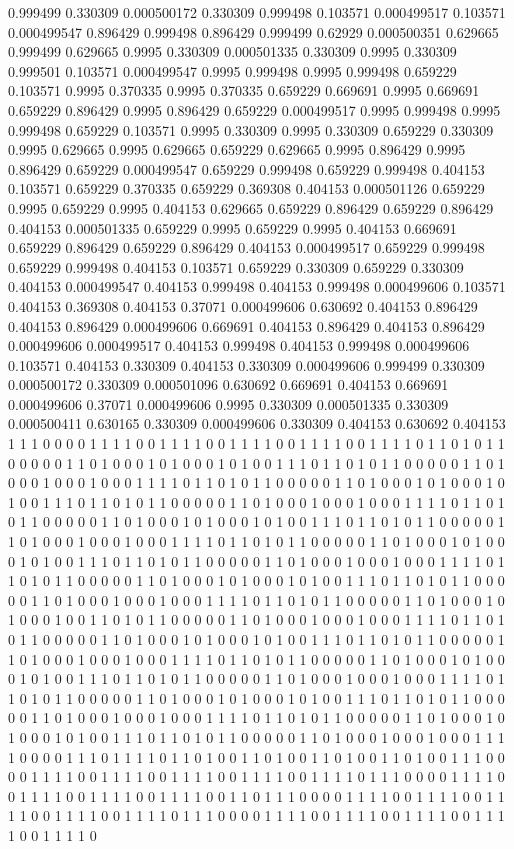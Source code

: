 0.999499 0.330309
0.000500172 0.330309
0.999498 0.103571
0.000499517 0.103571
0.000499547 0.896429
0.999498 0.896429
0.999499 0.62929
0.000500351 0.629665
0.999499 0.629665
0.9995 0.330309
0.000501335 0.330309
0.9995 0.330309
0.999501 0.103571
0.000499547 0.9995
0.999498 0.9995
0.999498 0.659229
0.103571 0.9995
0.370335 0.9995
0.370335 0.659229
0.669691 0.9995
0.669691 0.659229
0.896429 0.9995
0.896429 0.659229
0.000499517 0.9995
0.999498 0.9995
0.999498 0.659229
0.103571 0.9995
0.330309 0.9995
0.330309 0.659229
0.330309 0.9995
0.629665 0.9995
0.629665 0.659229
0.629665 0.9995
0.896429 0.9995
0.896429 0.659229
0.000499547 0.659229
0.999498 0.659229
0.999498 0.404153
0.103571 0.659229
0.370335 0.659229
0.369308 0.404153
0.000501126 0.659229
0.9995 0.659229
0.9995 0.404153
0.629665 0.659229
0.896429 0.659229
0.896429 0.404153
0.000501335 0.659229
0.9995 0.659229
0.9995 0.404153
0.669691 0.659229
0.896429 0.659229
0.896429 0.404153
0.000499517 0.659229
0.999498 0.659229
0.999498 0.404153
0.103571 0.659229
0.330309 0.659229
0.330309 0.404153
0.000499547 0.404153
0.999498 0.404153
0.999498 0.000499606
0.103571 0.404153
0.369308 0.404153
0.37071 0.000499606
0.630692 0.404153
0.896429 0.404153
0.896429 0.000499606
0.669691 0.404153
0.896429 0.404153
0.896429 0.000499606
0.000499517 0.404153
0.999498 0.404153
0.999498 0.000499606
0.103571 0.404153
0.330309 0.404153
0.330309 0.000499606
0.999499 0.330309
0.000500172 0.330309
0.000501096 0.630692
0.669691 0.404153
0.669691 0.000499606
0.37071 0.000499606
0.9995 0.330309
0.000501335 0.330309
0.000500411 0.630165
0.330309 0.000499606
0.330309 0.404153
0.630692 0.404153
1 1
1 0
0 0
0 1
1 1
1 0
0 1
1 1
1 0
0 1
1 1
1 0
0 1
1 1
1 0
0 1
1 1
1 0
1 1
0 1
0 1
1 0
0 0
0 0
1 1
0 1
0 0
0 1
0 1
0 0
0 1
0 1
0 0
1 1
1 0
1 1
0 1
0 1
1 0
0 0
0 0
1 1
0 1
0 0
0 1
0 0
0 1
0 0
0 1
1 1
1 0
1 1
0 1
0 1
1 0
0 0
0 0
1 1
0 1
0 0
0 1
0 1
0 0
0 1
0 1
0 0
1 1
1 0
1 1
0 1
0 1
1 0
0 0
0 0
1 1
0 1
0 0
0 1
0 0
0 1
0 0
0 1
1 1
1 0
1 1
0 1
0 1
1 0
0 0
0 0
1 1
0 1
0 0
0 1
0 1
0 0
0 1
0 1
0 0
1 1
1 0
1 1
0 1
0 1
1 0
0 0
0 0
1 1
0 1
0 0
0 1
0 0
0 1
0 0
0 1
1 1
1 0
1 1
0 1
0 1
1 0
0 0
0 0
1 1
0 1
0 0
0 1
0 1
0 0
0 1
0 1
0 0
1 1
1 0
1 1
0 1
0 1
1 0
0 0
0 0
1 1
0 1
0 0
0 1
0 0
0 1
0 0
0 1
1 1
1 0
1 1
0 1
0 1
1 0
0 0
0 0
1 1
0 1
0 0
0 1
0 1
0 0
0 1
0 1
0 0
1 1
1 0
1 1
0 1
0 1
1 0
0 0
0 0
1 1
0 1
0 0
0 1
0 0
0 1
0 0
0 1
1 1
1 0
1 1
0 1
0 1
1 0
0 0
0 0
1 1
0 1
0 0
0 1
0 1
0 0
0 1
0 0
1 1
0 1
0 1
1 0
0 0
0 0
1 1
0 1
0 0
0 1
0 0
0 1
0 0
0 1
1 1
1 0
1 1
0 1
0 1
1 0
0 0
0 0
1 1
0 1
0 0
0 1
0 1
0 0
0 1
0 1
0 0
1 1
1 0
1 1
0 1
0 1
1 0
0 0
0 0
1 1
0 1
0 0
0 1
0 0
0 1
0 0
0 1
1 1
1 0
1 1
0 1
0 1
1 0
0 0
0 0
1 1
0 1
0 0
0 1
0 1
0 0
0 1
0 1
0 0
1 1
1 0
1 1
0 1
0 1
1 0
0 0
0 0
1 1
0 1
0 0
0 1
0 0
0 1
0 0
0 1
1 1
1 0
1 1
0 1
0 1
1 0
0 0
0 0
1 1
0 1
0 0
0 1
0 1
0 0
0 1
0 1
0 0
1 1
1 0
1 1
0 1
0 1
1 0
0 0
0 0
1 1
0 1
0 0
0 1
0 0
0 1
0 0
0 1
1 1
1 0
1 1
0 1
0 1
1 0
0 0
0 0
1 1
0 1
0 0
0 1
0 1
0 0
0 1
0 1
0 0
1 1
1 0
1 1
0 1
0 1
1 0
0 0
0 0
1 1
0 1
0 0
0 1
0 0
0 1
0 0
0 1
1 1
1 0
0 0
0 1
1 1
0 1
1 1
1 0
1 1
0 1
0 0
1 1
0 1
0 0
1 1
0 1
0 0
1 1
0 1
0 0
1 1
1 0
0 0
0 1
1 1
1 0
0 1
1 1
1 0
0 1
1 1
1 0
0 1
1 1
1 0
0 1
1 1
1 0
1 1
1 0
0 0
0 1
1 1
1 0
0 1
1 1
1 0
0 1
1 1
1 0
0 1
1 1
1 0
0 1
1 0
1 1
1 0
0 0
0 1
1 1
1 0
0 1
1 1
1 0
0 1
1 1
1 0
0 1
1 1
1 0
0 1
1 1
1 0
1 1
1 0
0 0
0 1
1 1
1 0
0 1
1 1
1 0
0 1
1 1
1 0
0 1
1 1
1 0
0 1
1 1
1 0
